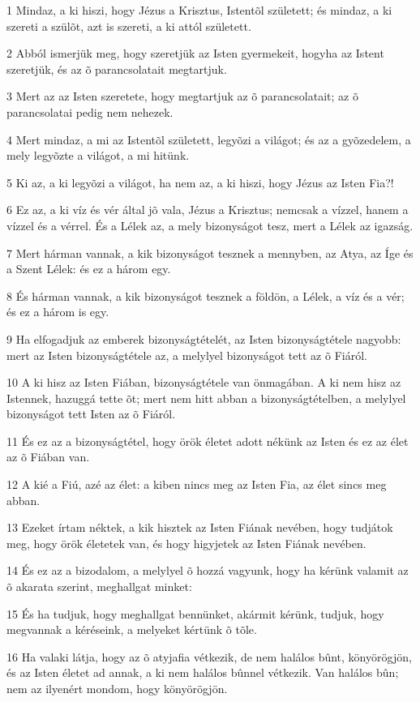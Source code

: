 \par 1 Mindaz, a ki hiszi, hogy Jézus a Krisztus, Istentõl született; és mindaz, a ki szereti a szülõt, azt is szereti, a ki attól született.
\par 2 Abból ismerjük meg, hogy szeretjük az Isten gyermekeit, hogyha az Istent szeretjük, és az õ parancsolatait megtartjuk.
\par 3 Mert az az Isten szeretete, hogy megtartjuk az õ parancsolatait; az õ parancsolatai pedig nem  nehezek.
\par 4 Mert mindaz, a mi az Istentõl született, legyõzi a világot; és az a gyõzedelem, a mely legyõzte a világot, a mi hitünk.
\par 5 Ki az, a ki legyõzi a világot, ha nem az, a ki hiszi, hogy Jézus az Isten Fia?!
\par 6 Ez az, a ki víz és vér által jõ vala, Jézus a Krisztus; nemcsak a vízzel, hanem a vízzel és a vérrel. És a Lélek az, a mely bizonyságot tesz, mert a Lélek az igazság.
\par 7 Mert hárman vannak, a kik bizonyságot tesznek a mennyben, az Atya, az Íge és a Szent Lélek: és ez a három egy.
\par 8 És hárman vannak, a kik bizonyságot tesznek a földön, a Lélek, a víz és a vér; és ez a három is egy.
\par 9 Ha elfogadjuk az emberek bizonyságtételét, az Isten bizonyságtétele nagyobb: mert az Isten bizonyságtétele az, a melylyel bizonyságot tett az õ Fiáról.
\par 10 A ki hisz az Isten Fiában, bizonyságtétele van önmagában. A ki nem hisz az Istennek, hazuggá tette õt; mert nem hitt abban a bizonyságtételben, a melylyel bizonyságot tett Isten az õ Fiáról.
\par 11 És ez az a bizonyságtétel, hogy örök életet adott nékünk az Isten és ez az élet az õ Fiában van.
\par 12 A kié a Fiú, azé az élet: a kiben nincs meg az Isten Fia, az élet sincs meg abban.
\par 13 Ezeket írtam néktek, a kik hisztek az Isten Fiának nevében, hogy tudjátok meg, hogy örök életetek van, és hogy higyjetek az Isten Fiának nevében.
\par 14 És ez az a bizodalom, a melylyel õ hozzá vagyunk, hogy ha kérünk valamit az õ akarata szerint, meghallgat minket:
\par 15 És ha tudjuk, hogy meghallgat bennünket, akármit kérünk, tudjuk, hogy megvannak a kéréseink, a melyeket kértünk õ tõle.
\par 16 Ha valaki látja, hogy az õ atyjafia vétkezik, de nem halálos bûnt, könyörögjön, és az Isten életet ad annak, a ki nem halálos bûnnel vétkezik. Van halálos bûn; nem az ilyenért mondom, hogy könyörögjön.
